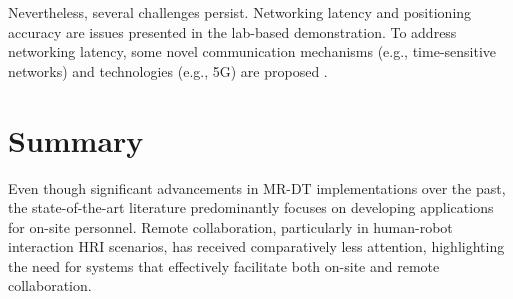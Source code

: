 \begin{enumerate}
    Nevertheless, several challenges persist. Networking latency and positioning accuracy are issues presented in the lab-based demonstration. To address networking latency, some novel communication mechanisms (e.g., time-sensitive networks) and technologies (e.g., 5G) are proposed \cite{LI2022102321}. 




\end{enumerate}

\section{Summary}

Even though significant advancements in \ac{MR}-\ac{DT} implementations over the past, the state-of-the-art literature predominantly focuses on developing applications for on-site personnel. Remote collaboration, particularly in human-robot interaction \ac{HRI} scenarios, has received comparatively less attention, highlighting the need for systems that effectively facilitate both on-site and remote collaboration.

